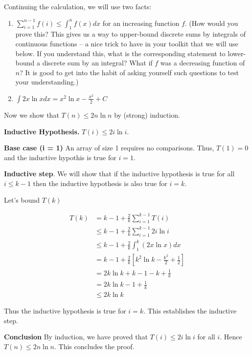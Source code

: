 \documentclass [12pt]{article}
\begin{document}
Continuing the calculation, we will use two facts:

\begin{enumerate}
  \item $\sum_{i=1}^{n-1} f(i) \leq \int_1^n f(x) dx$ for an increasing function $f$.
  (How would you prove this? This gives us a way to upper-bound discrete sums by integrals of continuous functions – a nice trick to have in your toolkit that we will use below. If you understand this, what is the corresponding statement to lower-bound a discrete sum by an integral? What if $f$ was a decreasing function of $n$? It is good to get into the habit of asking yourself such questions to test your understanding.)
  \item $\int 2x \ln x dx = x^2 \ln x - \frac{x^2}{2} + C$
\end{enumerate}

Now we show that $T(n) \leq 2n \ln n$ by (strong) induction.

\textbf{Inductive Hypothesis.} $T(i) \leq 2i \ln i$.

\textbf{Base case (i = 1)} An array of size 1 requires no comparisons. Thus, $T(1) = 0$ and the inductive hypothis is true for $i = 1$.

\textbf{Inductive step}. We will show that if the inductive hypothesis is true for all $i \leq k - 1$ then
the inductive hypothesis is also true for $i = k$.

Let's bound $T(k)$

\begin{align*}
T(k) &= k - 1 + \frac{2}{k}\sum_{i=1}^{k-1}T(i) \tag{by definition} \\
&\leq k - 1 + \frac{2}{k}\sum_{i=1}^{k-1}2i \ln i \tag{using our strong inductive hypothesis} \\
&\leq k - 1 + \frac{2}{k}\int_{1}^k (2x \ln x) dx \tag{Using fact 1 above} \\
&= k - 1 + \frac{2}{k}\left[k^2 \ln k - \frac{k^2}{2} + \frac{1}{2} \right] \tag{Using fact 2 above} \\
&= 2k \ln k + k - 1 - k + \frac{1}{k} \tag{simplify} \\
&= 2k \ln k - 1 + \frac{1}{k} \\
&\leq 2k \ln k
\end{align*}

Thus the inductive hypothesis is true for $i = k$. This establishes the inductive step.

\textbf{Conclusion} By induction, we have proved that $T(i) \leq 2i \ln i$ for all $i$. Hence $T(n) \leq
2n \ln n$. This concludes the proof.
\end{document}

